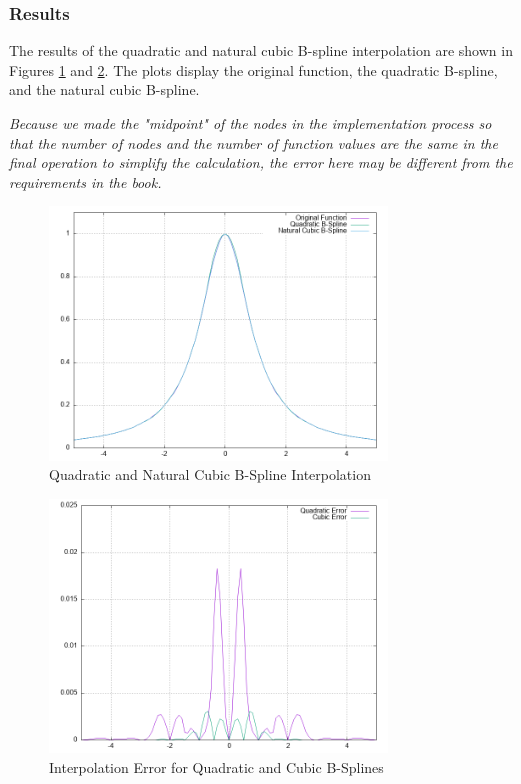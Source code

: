 \documentclass{article}
\begin{document}
\subsubsection{Results}
The results of the quadratic and natural cubic B-spline interpolation are shown in Figures \ref{fig:bspline} and \ref{fig:error}. The plots display the original function, the quadratic B-spline, and the natural cubic B-spline. \par
\emph{Because we made the "midpoint" of the nodes in the implementation process so that the number of nodes and the number of function values are the same in the final operation to simplify the calculation, the error here may be different from the requirements in the book.}

\begin{figure}[H]
    \centering
    \includegraphics[width=0.8\textwidth]{../figure/QCBspline_plot.png}
    \caption{Quadratic and Natural Cubic B-Spline Interpolation}
    \label{fig:bspline}
\end{figure}

\begin{figure}[H]
    \centering
    \includegraphics[width=0.8\textwidth]{../figure/error_plot.png}
    \caption{Interpolation Error for Quadratic and Cubic B-Splines}
    \label{fig:error}
\end{figure}
\end{document}
